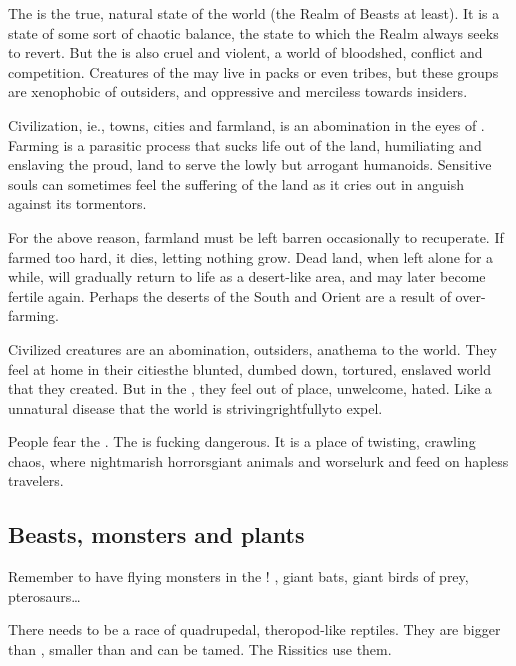 The \Wylde{} is the true, natural state of the world (the Realm of Beasts at least). 
It is a state of some sort of chaotic balance, the state to which the Realm always seeks to revert. 
But the \Wylde{} is also cruel and violent, a world of bloodshed, conflict and competition. 
Creatures of the \Wylde{} may live in packs or even tribes, but these groups are xenophobic of outsiders, and oppressive and merciless towards insiders. 

Civilization, ie., towns, cities and farmland, is an abomination in the eyes of . 
Farming is a parasitic process that sucks life out of the land, humiliating and enslaving the proud, \Wylde{} land to serve the lowly but arrogant humanoids. 
Sensitive souls can sometimes feel the suffering of the land as it cries out in anguish against its tormentors. 

For the above reason, farmland must be left barren occasionally to recuperate. 
If farmed too hard, it dies, letting nothing grow. 
Dead land, when left alone for a while, will gradually return to life as a \Wylde{} desert-like area, and may later become fertile again. 
Perhaps the deserts of the South and Orient are a result of over-farming. 

Civilized creatures are an abomination, outsiders, anathema to the world. 
They feel at home in their cities\dash the blunted, dumbed down, tortured, enslaved world that they created. 
But in the \Wylde{}, they feel out of place, unwelcome, hated. 
Like a unnatural disease that the world is striving\dash rightfully\dash to expel.

People fear the \wylde.
The \wylde is fucking dangerous.
It is a place of twisting, crawling chaos, where nightmarish horrors\dash{}giant animals and worse\dash{}lurk and feed on hapless travelers.





\subsection{Beasts, monsters and plants}
Remember to have flying monsters in the \Wylde{}! 
, giant bats, giant birds of prey, pterosaurs\ldots{} 

There needs to be a race of quadrupedal, theropod-like reptiles. 
They are bigger than \nycans, smaller than \cortios{} and can be tamed. 
The Rissitics use them. 





